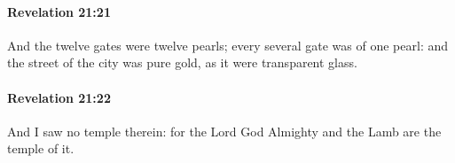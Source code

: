 		\paragraph{Revelation 21:21} %
			\label{REVELATIONNT-21-21}

			And the twelve gates were twelve pearls; every several gate was of one pearl: and the street of the city was pure gold, as it were transparent glass.

			\begin{framed}
			\scriptsize
				\begin{compactdesc}
					\item[SBLG] 
				\end{compactdesc}
			\end{framed}

		\paragraph{Revelation 21:22} %
			\label{REVELATIONNT-21-22}

			And I saw no temple therein: for the Lord God Almighty and the Lamb are the temple of it.

